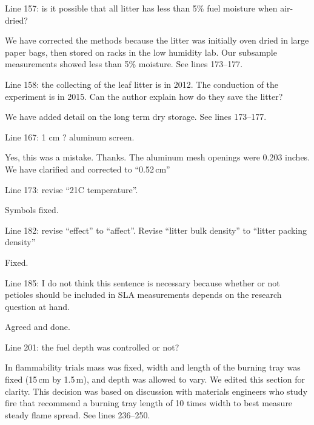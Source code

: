 \documentclass[letterpaper, 12pt]{letter}
\begin{document}
\begin{letter}{}
\begin{quoting}
  Line 157: is it possible that all litter has less than 5\% fuel moisture when
  air-dried?
\end{quoting}

We have corrected the methods because the litter was initially oven dried in
large paper bags, then stored on racks in the low humidity lab. Our subsample
measurements showed less than 5\% moisture. See lines 173--177.

\begin{quoting}
  Line 158: the collecting of the leaf litter is in 2012. The conduction of the
  experiment is in 2015. Can the author explain how do they save the litter?
\end{quoting}

We have added detail on the long term dry storage. See lines 173--177.

\begin{quoting}
Line 167: 1 cm ? aluminum screen.
\end{quoting}

Yes, this was a mistake. Thanks. The aluminum mesh openings were 0.203 inches.
We have clarified and corrected to ``0.52\,cm''

\begin{quoting}
  Line 173: revise “21C temperature”.
\end{quoting}

Symbols fixed.

\begin{quoting}
  Line 182: revise “effect” to “affect”. Revise “litter bulk density” to
  “litter packing density”
\end{quoting}

Fixed.

\begin{quoting}
  Line 185: I do not think this sentence is necessary because whether or not
  petioles should be included in SLA measurements depends on the research
  question at hand.
\end{quoting}

Agreed and done.

\begin{quoting}
  Line 201: the fuel depth was controlled or not?
\end{quoting}

In flammability trials mass was fixed, width and length of the burning tray was
fixed (15\,cm by 1.5\,m), and depth was allowed to vary. We edited this section
for clarity. This decision was based on discussion with materials engineers who
study fire that recommend a burning tray length of 10 times width to best
measure steady flame spread. See lines 236--250.


\end{letter}
\end{document}
